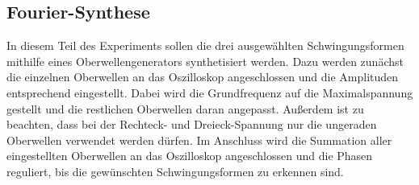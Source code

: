 \subsection{Fourier-Synthese}
In diesem Teil des Experiments sollen die drei ausgewählten Schwingungsformen mithilfe eines Oberwellengenerators
synthetisiert werden.
Dazu werden zunächst die einzelnen Oberwellen an das Oszilloskop angeschlossen und die Amplituden
entsprechend eingestellt. Dabei wird die Grundfrequenz auf die Maximalspannung gestellt und die restlichen Oberwellen daran
angepasst. Außerdem ist zu beachten, dass bei der Rechteck- und Dreieck-Spannung nur die ungeraden Oberwellen
verwendet werden dürfen.
Im Anschluss wird die Summation aller eingestellten Oberwellen an das Oszilloskop angeschlossen und die
Phasen reguliert, bis die gewünschten Schwingungsformen zu erkennen sind.
